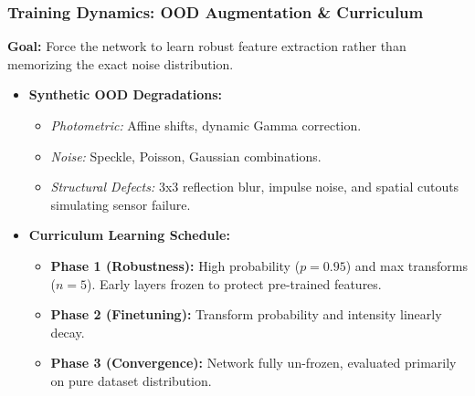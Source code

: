 \documentclass[aspectratio=169,xcolor=dvipsnames]{beamer}
\begin{document}
\begin{frame}
        \frametitle{Training Dynamics: OOD Augmentation \& Curriculum}
        \textbf{Goal:} Force the network to learn robust feature extraction rather than memorizing the exact noise distribution.
        \begin{itemize}
            \item \textbf{Synthetic OOD Degradations:}
            \begin{itemize}
                \item \textit{Photometric:} Affine shifts, dynamic Gamma correction.
                \item \textit{Noise:} Speckle, Poisson, Gaussian combinations.
                \item \textit{Structural Defects:} 3x3 reflection blur, impulse noise, and spatial cutouts simulating sensor failure.
            \end{itemize}
            \item \textbf{Curriculum Learning Schedule:}
            \begin{itemize}
                \item \textbf{Phase 1 (Robustness):} High probability ($p=0.95$) and max transforms ($n=5$). Early layers frozen to protect pre-trained features.
                \item \textbf{Phase 2 (Finetuning):} Transform probability and intensity linearly decay.
                \item \textbf{Phase 3 (Convergence):} Network fully un-frozen, evaluated primarily on pure dataset distribution.
            \end{itemize}
        \end{itemize}
    \end{frame}
\end{document}
